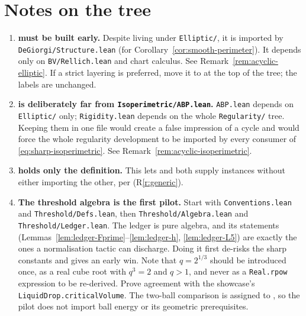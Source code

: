 

\section{Notes on the tree}

\begin{enumerate}[leftmargin=*]

\item \textbf{ must be built early.}
  Despite living under \texttt{Elliptic/}, it is imported by
  \texttt{DeGiorgi/Structure.lean} (for
  Corollary~\ref{cor:smooth-perimeter}).  It depends only on
  \texttt{BV/Rellich.lean} and chart calculus.  See
  Remark~\ref{rem:acyclic-elliptic}.  If a strict layering is preferred, move
  it to  at the top of the tree; the
  labels are unchanged.

\item \textbf{ is deliberately far from
  \texttt{Isoperimetric/ABP.lean}.}  \texttt{ABP.lean} depends on
  \texttt{Elliptic/} only; \texttt{Rigidity.lean} depends on the whole
  \texttt{Regularity/} tree.  Keeping them in one file would create a false
  impression of a cycle and would force the whole regularity development to be
  imported by every consumer of \eqref{eq:sharp-isoperimetric}.  See
  Remark~\ref{rem:acyclic-isoperimetric}.

\item \textbf{ holds only the
  definition.}  This lets  and
   both supply instances without either
  importing the other, per (R\ref{r:generic}).

\item \textbf{The threshold algebra is the first pilot.}  Start with
  \texttt{Conventions.lean} and \texttt{Threshold/Defs.lean}, then
  \texttt{Threshold/Algebra.lean} and \texttt{Threshold/Ledger.lean}.
  The ledger is pure algebra, and its statements
  (Lemmas~\ref{lem:ledger-Fprime}--\ref{lem:ledger-h},
  \ref{lem:ledger-L5}) are exactly the ones a normalisation tactic can
  discharge.  Doing it first de-risks the sharp constants and gives an early
  win.  Note that $q=2^{1/3}$ should be introduced once, as a real cube root
  with $q^3=2$ and $q>1$, and never as a \texttt{Real.rpow} expression to be
  re-derived.  Prove agreement with the showcase's
  \texttt{LiquidDrop.criticalVolume}.  The two-ball comparison is assigned
  to , so the pilot does not import ball
  energy or its geometric prerequisites.


\end{enumerate}
